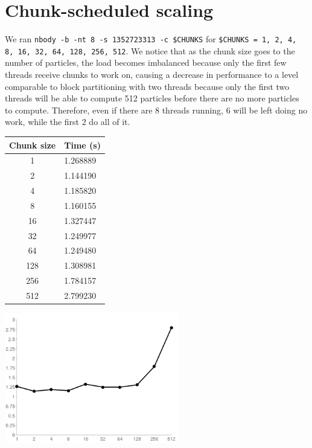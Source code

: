 \documentclass{article}[12pt;letterpaper]
\begin{document}
\section{Chunk-scheduled scaling}

We ran \texttt{nbody -b -nt 8 -s 1352723313 -c \$CHUNKS} for \texttt{\$CHUNKS =
1, 2, 4, 8, 16, 32, 64, 128, 256, 512}. We notice that as the chunk size goes
to the number of particles, the load becomes imbalanced because only the first
few threads receive chunks to work on, causing a decrease in performance to a
level comparable to block partitioning with two threads because only the first two 
threads will be able to compute 512 particles before there are no more particles to 
compute. Therefore, even if there are 8 threads running, 6 will be left doing no work,
while the first 2 do all of it.

\begin{center}\begin{tabular}{c l}
Chunk size & Time (s) \\
\hline{}
  1 & 1.268889 \\
  2 & 1.144190 \\
  4 & 1.185820 \\
  8 & 1.160155 \\
 16 & 1.327447 \\
 32 & 1.249977 \\
 64 & 1.249480 \\
128 & 1.308981 \\
256 & 1.784157 \\
512 & 2.799230
\end{tabular}

\includegraphics[width=3in]{a2_sec2_1.png}
\end{center}
\end{document}
